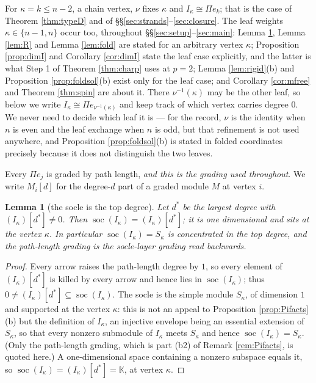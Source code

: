 \documentclass[reqno]{amsart}
\theoremstyle{plain}
\newtheorem{lemma}[theorem]{Lemma}
\theoremstyle{definition}
\DeclareMathOperator{\soc}{soc}
\newcommand{\ka}{\kappa}
\newcommand{\Pia}{\Pi}
\begin{document}
For $\ka=k\le n-2$, a chain vertex, $\nu$ fixes
$\ka$ and $I_\ka\cong\Pia e_k$; that is the case of Theorem \ref{thm:typeD} and
of \S\S\ref{sec:strands}--\ref{sec:closure}.  The leaf weights $\ka\in\{n-1,n\}$
occur too, throughout \S\S\ref{sec:setup}--\ref{sec:main}: Lemma
\ref{lem:soctop}, Lemma \ref{lem:R} and Lemma \ref{lem:fold} are stated for an
arbitrary vertex $\ka$; Proposition
\ref{prop:dimI} and Corollary \ref{cor:dimI} state the leaf case explicitly,
and the latter is what Step 1 of Theorem \ref{thm:charp} uses at $p=2$; Lemma
\ref{lem:rigid}\textup{(b)} and Proposition \ref{prop:foldsol}\textup{(b)}
exist only for the leaf case; and Corollary \ref{cor:mfree} and Theorem
\ref{thm:spin} are about it.  There $\nu^{-1}(\ka)$ may be the other leaf, so
below we write $I_\ka\cong\Pia e_{\nu^{-1}(\ka)}$ and keep track of which vertex
carries degree $0$.  We never need to decide which leaf it is --- for the
record, $\nu$ is the identity when $n$ is even and the leaf exchange when $n$
is odd, but that refinement is not used anywhere, and Proposition
\ref{prop:foldsol}\textup{(b)} is stated in folded coordinates precisely
because it does not distinguish the two leaves.

Every $\Pia e_j$ is graded by path length, \emph{and this is the grading used
throughout}.  We write $M_i[d]$ for the degree-$d$ part of a graded module $M$
at vertex $i$.

\begin{lemma}[the socle is the top degree]\label{lem:soctop}
Let $d^{*}$ be the largest degree with $(I_\ka)[d^{*}]\ne0$.  Then
$\soc(I_\ka)=(I_\ka)[d^{*}]$; it is one dimensional and sits at the vertex
$\ka$.  In particular $\soc(I_\ka)=S_\ka$ is concentrated in the top degree,
and the path-length grading is the socle-layer grading read backwards.
\end{lemma}

\begin{proof}
Every arrow raises the path-length degree by $1$, so every element of
$(I_\ka)[d^{*}]$ is killed by every arrow and hence lies in $\soc(I_\ka)$;
thus $0\ne(I_\ka)[d^{*}]\subseteq\soc(I_\ka)$.  The socle is the simple
module $S_\ka$, of dimension $1$ and supported at the vertex $\ka$: this is
not an appeal to Proposition \ref{prop:Pifacts}(b) but the definition of
$I_\ka$, an injective envelope being an essential extension of $S_\ka$, so
that every nonzero submodule of $I_\ka$ meets $S_\ka$ and hence
$\soc(I_\ka)=S_\ka$.  (Only the path-length grading, which is part
\textup{(b2)} of Remark \ref{rem:Pifacts}, is quoted here.)  A
one-dimensional space containing a
nonzero subspace equals it, so $\soc(I_\ka)=(I_\ka)[d^{*}]=\mathbb{K}$, at
vertex $\ka$.
\end{proof}
\end{document}
